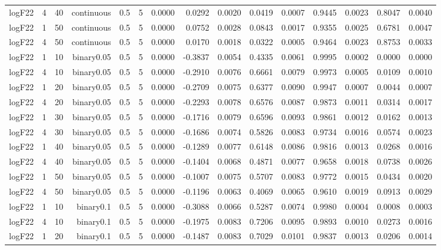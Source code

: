 \begin{longtable}{rrrrrrrrrrrrrrr}
  logF22 & 4 & 40 & continuous & 0.5 & 5 & 0.0000 & 0.0292 & 0.0020 & 0.0419 & 0.0007 & 0.9445 & 0.0023 & 0.8047 & 0.0040 \\ 
  logF22 & 1 & 50 & continuous & 0.5 & 5 & 0.0000 & 0.0752 & 0.0028 & 0.0843 & 0.0017 & 0.9355 & 0.0025 & 0.6781 & 0.0047 \\ 
  logF22 & 4 & 50 & continuous & 0.5 & 5 & 0.0000 & 0.0170 & 0.0018 & 0.0322 & 0.0005 & 0.9464 & 0.0023 & 0.8753 & 0.0033 \\ 
  logF22 & 1 & 10 & binary0.05 & 0.5 & 5 & 0.0000 & -0.3837 & 0.0054 & 0.4335 & 0.0061 & 0.9995 & 0.0002 & 0.0000 & 0.0000 \\ 
  logF22 & 4 & 10 & binary0.05 & 0.5 & 5 & 0.0000 & -0.2910 & 0.0076 & 0.6661 & 0.0079 & 0.9973 & 0.0005 & 0.0109 & 0.0010 \\ 
  logF22 & 1 & 20 & binary0.05 & 0.5 & 5 & 0.0000 & -0.2709 & 0.0075 & 0.6377 & 0.0090 & 0.9947 & 0.0007 & 0.0044 & 0.0007 \\ 
  logF22 & 4 & 20 & binary0.05 & 0.5 & 5 & 0.0000 & -0.2293 & 0.0078 & 0.6576 & 0.0087 & 0.9873 & 0.0011 & 0.0314 & 0.0017 \\ 
  logF22 & 1 & 30 & binary0.05 & 0.5 & 5 & 0.0000 & -0.1716 & 0.0079 & 0.6596 & 0.0093 & 0.9861 & 0.0012 & 0.0162 & 0.0013 \\ 
  logF22 & 4 & 30 & binary0.05 & 0.5 & 5 & 0.0000 & -0.1686 & 0.0074 & 0.5826 & 0.0083 & 0.9734 & 0.0016 & 0.0574 & 0.0023 \\ 
  logF22 & 1 & 40 & binary0.05 & 0.5 & 5 & 0.0000 & -0.1289 & 0.0077 & 0.6148 & 0.0086 & 0.9816 & 0.0013 & 0.0268 & 0.0016 \\ 
  logF22 & 4 & 40 & binary0.05 & 0.5 & 5 & 0.0000 & -0.1404 & 0.0068 & 0.4871 & 0.0077 & 0.9658 & 0.0018 & 0.0738 & 0.0026 \\ 
  logF22 & 1 & 50 & binary0.05 & 0.5 & 5 & 0.0000 & -0.1007 & 0.0075 & 0.5707 & 0.0083 & 0.9772 & 0.0015 & 0.0434 & 0.0020 \\ 
  logF22 & 4 & 50 & binary0.05 & 0.5 & 5 & 0.0000 & -0.1196 & 0.0063 & 0.4069 & 0.0065 & 0.9610 & 0.0019 & 0.0913 & 0.0029 \\ 
  logF22 & 1 & 10 & binary0.1 & 0.5 & 5 & 0.0000 & -0.3088 & 0.0066 & 0.5287 & 0.0074 & 0.9980 & 0.0004 & 0.0008 & 0.0003 \\ 
  logF22 & 4 & 10 & binary0.1 & 0.5 & 5 & 0.0000 & -0.1975 & 0.0083 & 0.7206 & 0.0095 & 0.9893 & 0.0010 & 0.0273 & 0.0016 \\ 
  logF22 & 1 & 20 & binary0.1 & 0.5 & 5 & 0.0000 & -0.1487 & 0.0083 & 0.7029 & 0.0101 & 0.9837 & 0.0013 & 0.0206 & 0.0014 \\ 

\end{longtable}
